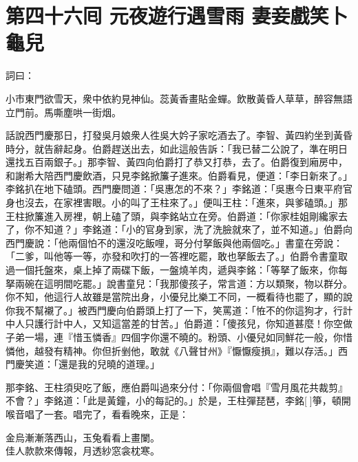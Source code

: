 
\chapter*{第四十六囘 元夜遊行遇雪雨 妻妾戲笑卜龜兒}


詞曰：

\begin{myquote}
小市東門欲雪天，衆中依約見神仙。蕊黃香畫貼金蟬。飲散黃昏人草草，醉容無語立門前。馬嘶塵哄一街烟。

\end{myquote}

話說西門慶那日，打發吳月娘衆人徃吳大妗子家吃酒去了。李智、黃四約坐到黃昏時分，就告辭起身。伯爵趕送出去，如此這般告訴：「我已替二公說了，準在明日還找五百兩銀子。」那李智、黃四向伯爵打了恭又打恭，去了。伯爵復到廂房中，和謝希大陪西門慶飲酒，只見李銘掀簾子進來。伯爵看見，便道：「李日新來了。」李銘扒在地下磕頭。西門慶問道：「吳惠怎的不來？」李銘道：「吳惠今日東平府官身也沒去，在家裡害眼。小的叫了王柱來了。」便叫王柱：「進來，與爹磕頭。」那王柱掀簾進入房裡，朝上磕了頭，與李銘站立在旁。伯爵道：「你家桂姐剛纔家去了，你不知道？」李銘道：「小的官身到家，洗了洗臉就來了，並不知道。」伯爵向西門慶說：「他兩個怕不的還沒吃飯哩，哥分付拏飯與他兩個吃。」書童在旁說：「二爹，叫他等一等，亦發和吹打的一答裡吃罷，敢也拏飯去了。」伯爵令書童取過一個托盤來，桌上掉了兩碟下飯，一盤燒羊肉，遞與李銘：「等拏了飯來，你每拏兩碗在這明間吃罷。」說書童兒：「我那傻孩子，常言道：方以類聚，物以群分。你不知，他這行人故雖是當院出身，小優兒比樂工不同，一概看待也罷了，顯的說你我不幫襯了。」被西門慶向伯爵頭上打了一下，笑罵道：「恠不的你這狗才，行計中人只護行計中人，又知這當差的甘苦。」伯爵道：「傻孩兒，你知道甚麼！你空做子弟一場，連『惜玉憐香』四個字你還不曉的。粉頭、小優兒如同鮮花一般，你惜憐他，越發有精神。你但折剉他，敢就《八聲甘州》『懨懨瘦損』，難以存活。」西門慶笑道：「還是我的兒曉的道理。」

那李銘、王柱須臾吃了飯，應伯爵叫過來分付：「你兩個會唱『雪月風花共裁剪』不會？」李銘道：「此是黃鐘，小的每記的。」於是，王柱彈琵琶，李銘[]箏，頓開喉音唱了一套。唱完了，看看晚來，正是：

\begin{myquote}
金烏漸漸落西山，玉兔看看上畫闌。\\佳人款款來傳報，月透紗窓衾枕寒。
\end{myquote}


